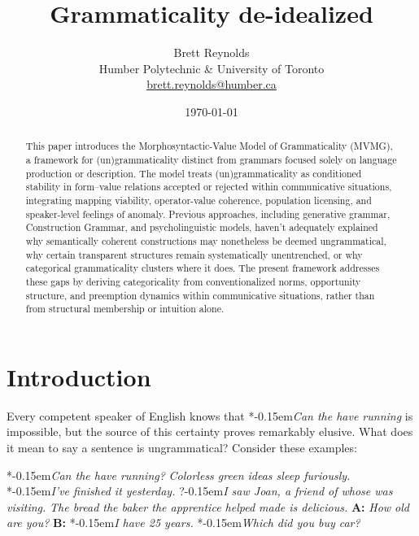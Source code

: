 \documentclass[12pt,letterpaper]{article}
\title{Grammaticality de-idealized}
\author{Brett Reynolds \orcidlink{0000-0003-0073-7195}\\
  Humber Polytechnic \& University of Toronto\\
  \href{mailto:brett.reynolds@humber.ca}{brett.reynolds@humber.ca}}
\date{\today}
\newcommand{\mention}[1]{\textit{#1}}
\newcommand{\judgesep}{\kern-0.15em}
\newcommand{\ungram}[1]{*\judgesep#1}
\newcommand{\marg}[1]{?\judgesep#1}
\begin{document}
\maketitle

\begin{abstract}
    This paper introduces the Morphosyntactic-Value Model of Grammaticality (MVMG), a framework for (un)gram\-maticality distinct from grammars focused solely on language production or description. The model treats (un)grammaticality as conditioned stability in form--value relations accepted or rejected within communicative situations, integrating mapping viability, operator-value coherence, population licensing, and speaker-level feelings of anomaly. Previous approaches, including generative grammar, Construction Grammar, and psycholinguistic models, haven't adequately explained why semantically coherent constructions may nonetheless be deemed ungrammatical, why certain transparent structures remain systematically unentrenched, or why categorical grammaticality clusters where it does. The present framework addresses these gaps by deriving categoricality from conventionalized norms, opportunity structure, and preemption dynamics within communicative situations, rather than from structural membership or intuition alone.
\end{abstract}


\newpage
\section*{Introduction}

Every competent speaker of English knows that \ungram{\mention{Can the have running}} is impossible, but the source of this certainty proves remarkably elusive. What does it mean to say a sentence is ungrammatical? Consider these examples:

\ea \label{ex:starting-stars}
\ea\label{ex:nonsense} \ungram{\mention{Can the have running?}}
\ex\label{ex:colorless-grammatica} \mention{Colorless green ideas sleep furiously.} \autocite{chomsky1957}
\ex\label{ex:tense} \ungram{\mention{I've finished it yesterday.}}
\ex\marg{\mention{I saw Joan, a friend of whose was visiting.}}\label{ex:whose} 
\ex\label{ex:center} \mention{The bread the baker the apprentice helped made is delicious.}
\ex\label{ex:age} \textbf{A:} \mention{How old are you?} \textbf{B:} \ungram{\mention{I have 25 years.}}
\ex\label{ex:lbe} \ungram{\mention{Which did you buy car?}}
\z\z
\end{document}
